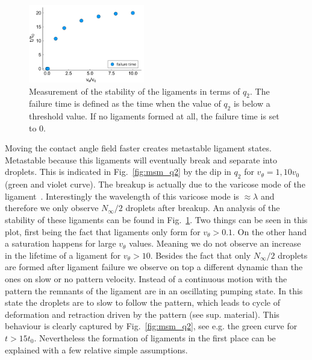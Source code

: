 \documentclass[twocolumn,amsmath,amssymb,showpacs,pre,nofootinbib,superscriptaddress]{revtex4-1} %
\begin{document}
\begin{figure}
    \centering
    \includegraphics[width=0.45\textwidth]{Figures/stab_lig_lam2_v2.pdf}
    \caption{Measurement of the stability of the ligaments in terms of $q_2$.
    The failure time is defined as the time when the value of $q_2$ is below a threshold value.
    If no ligaments formed at all, the failure time is set to 0.
    }
    \label{fig:stab_ligs_lam2}
\end{figure}
Moving the contact angle field faster creates metastable ligament states.
Metastable because this ligaments will eventually break and separate into droplets.
This is indicated in Fig.~\ref{fig:msm_q2} by the dip in $q_2$ for $v_{\theta} = 1, 10 v_0$ (green and violet curve).
The breakup is actually due to the varicose mode of the ligament~\cite{doi:10.1063/1.3211248, PhysRevE.77.061605}.
Interestingly the wavelength of this varicose mode is $\approx\lambda$ and therefore we only observe $N_{\infty}/2$ droplets after breakup.
An analysis of the stability of these ligaments can be found in Fig.~\ref{fig:stab_ligs_lam2}.
Two things can be seen in this plot, first being the fact that ligaments only form for $v_{\theta} > 0.1$.
On the other hand a saturation happens for large $v_{\theta}$ values. 
Meaning we do not observe an increase in the lifetime of a ligament for $v_{\theta} > 10$.
Besides the fact that only $N_{\infty}/2$ droplets are formed after ligament failure we observe on top a different dynamic than the ones on slow or no pattern velocity.   
Instead of a continuous motion with the pattern the remnants of the ligament are in an oscillating pumping state.
In this state the droplets are to slow to follow the pattern, which leads to cycle of deformation and retraction driven by the pattern (see sup. material).
This behaviour is clearly captured by Fig.~\ref{fig:msm_q2}, see e.g. the green curve for $t > 15t_0$.
Nevertheless the formation of ligaments in the first place can be explained with a few relative simple assumptions.
\end{document}
